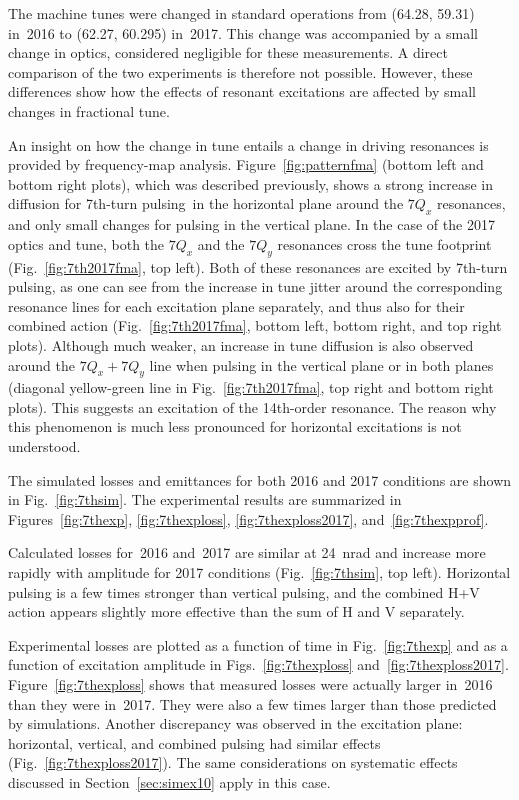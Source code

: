 \documentclass[aps
,prstab
,reprint
,longbibliography
,preprintnumbers
,showkeys
,amsfonts,amssymb,amsmath
,floatfix
]{revtex4-1}
\newcommand{\seventhtp}{7th-turn pulsing}
\begin{document}
The machine tunes were changed in standard operations from (64.28,
59.31) in~2016 to (62.27, 60.295) in~2017. This change was accompanied
by a small change in optics, considered negligible for these
measurements. A direct comparison of the two experiments is therefore
not possible. However, these differences show how the effects of
resonant excitations are affected by small changes in fractional tune.

An insight on how the change in tune entails a change in driving
resonances is provided by frequency-map analysis.
Figure~\ref{fig:patternfma} (bottom left and bottom right plots),
which was described previously, shows a strong increase in diffusion
for \seventhtp\ in the horizontal plane around the $7Q_x$ resonances,
and only small changes for pulsing in the vertical plane. In the case
of the 2017 optics and tune, both the $7Q_x$ and the $7Q_y$ resonances
cross the tune footprint (Fig.~\ref{fig:7th2017fma}, top left). Both
of these resonances are excited by \seventhtp, as one can see from the
increase in tune jitter around the corresponding resonance lines for
each excitation plane separately, and thus also for their combined
action (Fig.~\ref{fig:7th2017fma}, bottom left, bottom right, and top
right plots). Although much weaker, an increase in tune diffusion is
also observed around the $7Q_x + 7Q_y$ line when pulsing in the
vertical plane or in both planes (diagonal yellow-green line in
Fig.~\ref{fig:7th2017fma}, top right and bottom right plots). This
suggests an excitation of the 14th-order resonance. The reason why
this phenomenon is much less pronounced for horizontal excitations is
not understood.

The simulated losses and emittances for both 2016 and 2017 conditions
are shown in Fig.~\ref{fig:7thsim}. The experimental results are
summarized in Figures~\ref{fig:7thexp}, \ref{fig:7thexploss},
\ref{fig:7thexploss2017}, and~\ref{fig:7thexpprof}.

Calculated losses for~2016 and~2017 are similar at 24~nrad and
increase more rapidly with amplitude for 2017 conditions
(Fig.~\ref{fig:7thsim}, top left). Horizontal pulsing is a few times
stronger than vertical pulsing, and the combined H+V action appears
slightly more effective than the sum of H and V separately.

Experimental losses are plotted as a function of time in
Fig.~\ref{fig:7thexp} and as a function of excitation amplitude in
Figs.~\ref{fig:7thexploss}
and~\ref{fig:7thexploss2017}. Figure~\ref{fig:7thexploss} shows that
measured losses were actually larger in~2016 than they were
in~2017. They were also a few times larger than those predicted by
simulations. Another discrepancy was observed in the excitation plane:
horizontal, vertical, and combined pulsing had similar effects
(Fig.~\ref{fig:7thexploss2017}). The same considerations on systematic
effects discussed in Section~\ref{sec:simex10} apply in this case.
\end{document}
